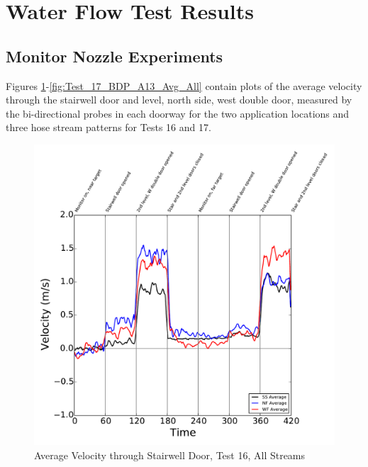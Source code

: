 \documentclass[12pt,oneside]{book}
\begin{document}
\section{Water Flow Test Results}
\label{sec:Water_Flow_Test_Results}


\subsection{Monitor Nozzle Experiments}

Figures \ref{fig:Test_16_BDP_A10_Avg_All}-\ref{fig:Test_17_BDP_A13_Avg_All} contain plots of the average velocity through the stairwell door and  level, north side, west double door, measured by the bi-directional probes in each doorway for the two application locations and three hose stream patterns for Tests 16 and 17. 

\begin{figure}[!ht]
\includegraphics[width=6in]{../../../Figures/Hose_Test_Figures/Test_16_West_063014_custom_BDP_A10_Avg}
\caption{Average Velocity through Stairwell Door, Test 16, All Streams}
\label{fig:Test_16_BDP_A10_Avg_All}
\end{figure}
\end{document}
